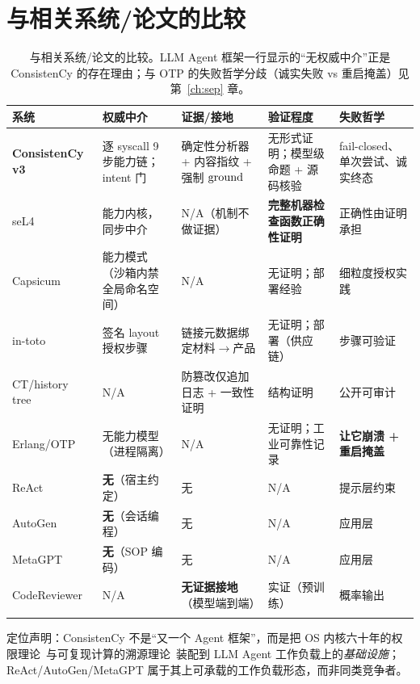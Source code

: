 \chapter{与相关系统/论文的比较}\label{ch:comparison}

\begin{longtable}{@{}>{\raggedright\arraybackslash}p{2.2cm}>{\raggedright\arraybackslash}p{2.6cm}>{\raggedright\arraybackslash}p{2.6cm}>{\raggedright\arraybackslash}p{2.5cm}>{\raggedright\arraybackslash}p{2.5cm}@{}}
\toprule
\textbf{系统} & \textbf{权威中介} & \textbf{证据/接地} & \textbf{验证程度} & \textbf{失败哲学}\\
\midrule
\endhead
\textbf{ConsistenCy v3} & 逐 syscall 9 步能力链；intent 门 & 确定性分析器 + 内容指纹 + 强制 $\operatorname{ground}$ & 无形式证明；模型级命题 + 源码核验 & fail-closed、单次尝试、诚实终态\\
seL4~\cite{klein2009} & 能力内核，同步中介 & N/A（机制不做证据） & \textbf{完整机器检查函数正确性证明} & 正确性由证明承担\\
Capsicum~\cite{watson2010} & 能力模式（沙箱内禁全局命名空间） & N/A & 无证明；部署经验 & 细粒度授权实践\\
in-toto~\cite{torresarias2019} & 签名 layout 授权步骤 & 链接元数据绑定材料$\to$产品 & 无证明；部署（供应链） & 步骤可验证\\
CT/history tree~\cite{crosby2009} & N/A & 防篡改仅追加日志 + 一致性证明 & 结构证明 & 公开可审计\\
Erlang/OTP~\cite{armstrong2003} & 无能力模型（进程隔离） & N/A & 无证明；工业可靠性记录 & \textbf{让它崩溃 + 重启掩盖}\\
ReAct~\cite{yao2023react} & \textbf{无}（宿主约定） & 无 & N/A & 提示层约束\\
AutoGen~\cite{wu2024autogen} & \textbf{无}（会话编程） & 无 & N/A & 应用层\\
MetaGPT~\cite{hong2024metagpt} & \textbf{无}（SOP 编码） & 无 & N/A & 应用层\\
CodeReviewer~\cite{li2022codereviewer} & N/A & \textbf{无证据接地}（模型端到端） & 实证（预训练） & 概率输出\\
\bottomrule
\caption{与相关系统/论文的比较。LLM Agent 框架一行显示的“无权威中介”正是 ConsistenCy 的存在理由；与 OTP 的失败哲学分歧（诚实失败 vs 重启掩盖）见第~\ref{ch:sep} 章。}
\label{tab:comparison}
\end{longtable}

定位声明：ConsistenCy 不是“又一个 Agent 框架”，而是把 OS 内核六十年的权限理论~\cite{dennis1966,anderson1972,saltzer1975}与可复现计算的溯源理论~\cite{buneman2001,provdm2013,merkle1989}装配到 LLM Agent 工作负载上的\emph{基础设施}；ReAct/AutoGen/MetaGPT 属于其上可承载的工作负载形态，而非同类竞争者。

